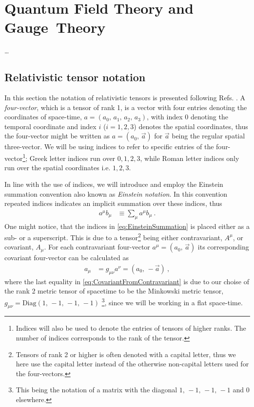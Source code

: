 \documentclass[../main.tex]{subfiles} %
\begin{document}
\chapter{Quantum Field Theory and Gauge~Theory} \label{chap:ContinuumQFT}

\ldots
\lipsum[1-4]




\section{Relativistic tensor notation}

In this section the notation of relativistic tensors is presented following Refs. \cite{peskin_introToQFT_1995,Uggerhoej_SpecielRelativitetsteori_2016}. A \emph{four-vector}, which is a tensor of rank 1, is a vector with four entries denoting the coordinates of space-time, $a = (a_0,\, a_1,\, a_2,\, a_3)$, with index $0$ denoting the temporal coordinate and index $i$ ($i = 1,2,3$) denotes the spatial coordinates, thus the four-vector might be written as $a = (a_0,\, \Vec{a})$ for $\Vec{a}$ being the regular spatial three-vector. We will be using indices to refer to specific entries of the four-vector\footnote{Indices will also be used to denote the entries of tensors of higher ranks. The number of indices corresponds to the rank of the tensor.}; Greek letter indices run over $0,1,2,3$, while Roman letter indices only run over the spatial coordinates i.e. $1,2,3$.

In line with the use of indices, we will introduce and employ the Einstein summation convention also known as \emph{Einstein notation}. In this convention repeated indices indicates an implicit summation over these indices, thus
\begin{align} \label{eq:EinsteinSummation}
    a^\mu b_\mu &\equiv \sum_\mu a^\mu b_\mu \: .
\end{align}
One might notice, that the indices in \cref{eq:EinsteinSummation} is placed either as a sub- or a superscript. This is due to a tensor\footnote{Tensors of rank 2 or higher is often denoted with a capital letter, thus we here use the capital letter instead of the otherwise non-capital letters used for the four-vectors.} being either contravariant, $A^\mu$, or covariant, $A_\mu$. For each contravariant four-vector $a^\mu = (a_0,\, \Vec{a})$ its corresponding covariant four-vector can be calculated as
\begin{align} \label{eq:CovariantFromContravariant}
    a_\mu &= g_{\mu\nu}a^\nu = (a_0,\, -\Vec{a}) \: ,
\end{align}
where the last equality in \cref{eq:CovariantFromContravariant} is due to our choise of the rank 2 metric tensor of spacetime to be the Minkowski metric tensor, $g_{\mu\nu} = \text{Diag}(1,\, -1,\, -1,\, -1)$ \footnote{This being the notation of a matrix with the diagonal $1,\, -1,\, -1,\, -1$ and $0$ elsewhere.}, since we will be working in a flat space-time.
\end{document}
